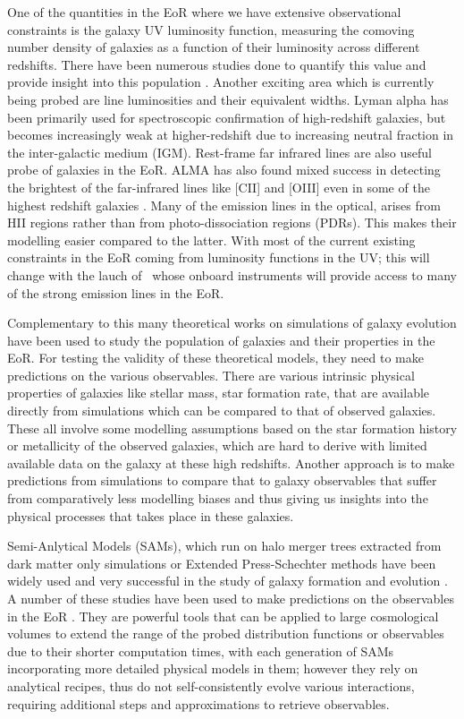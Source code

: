 One of the quantities in the EoR where we have extensive observational constraints is the galaxy UV luminosity function, measuring the comoving number density of galaxies as a function of their luminosity across different redshifts. There have been numerous studies done to quantify this value and provide insight into this population \citep[\eg][]{Bouwens_2015a,McLeod2015,Finkelstein2015,Livermore2017,Atek2018,Stefanon2019,Bowler2020}. Another exciting area which is currently being probed are line luminosities and their equivalent widths. Lyman alpha has been primarily used for spectroscopic confirmation of high-redshift galaxies, but becomes increasingly weak at higher-redshift due to increasing neutral fraction in the inter-galactic medium (IGM). Rest-frame far infrared lines are also useful probe of galaxies in the EoR. ALMA has also found mixed success in detecting the brightest of the far-infrared lines like [CII] and [OIII] even in some of the highest redshift galaxies \citep[\eg][]{Hashimoto2018,Harikane2019}. Many of the emission lines in the optical, arises from HII regions rather than from photo-dissociation regions (PDRs). This makes their modelling easier compared to the latter. With most of the current existing constraints in the EoR coming from luminosity functions in the UV; this will change with the lauch of \jwst\, whose onboard instruments will provide access to many of the strong emission lines in the EoR. 

Complementary to this many theoretical works on simulations of galaxy evolution have been used to study the population of galaxies and their properties in the EoR. For testing the validity of these theoretical models, they need to make predictions on the various observables. There are various intrinsic physical properties of galaxies like stellar mass, star formation rate, that are available directly from simulations which can be compared to that of observed galaxies. These all involve some modelling assumptions based on the star formation history or metallicity of the observed galaxies, which are hard to derive with limited available data on the galaxy at these high redshifts. Another approach is to make predictions from simulations to compare that to galaxy observables that suffer from comparatively less modelling biases and thus giving us insights into the physical processes that takes place in these galaxies.  

Semi-Anlytical Models (SAMs), which run on halo merger trees extracted from dark matter only simulations or Extended Press-Schechter methods have been widely used and very successful in the study of galaxy formation and evolution \citep[\eg][]{henriques2015,Somerville2015,Rodrigues2017}. A number of these studies have been used to make predictions on the observables in the EoR \citep[\eg][]{Clay2015,Poole2016,Lacey2016,Yung2019,Hutter2020}. They are powerful tools that can be applied to large cosmological volumes to extend the range of the probed distribution functions or observables due to their shorter computation times, with each generation of SAMs incorporating more detailed physical models in them; however they rely on analytical recipes, thus do not self-consistently evolve various interactions, requiring additional steps and approximations to retrieve observables.

